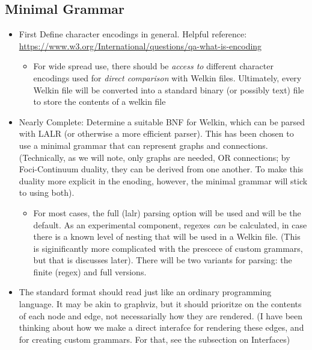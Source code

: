 \subsection{Minimal Grammar}
\begin{itemize}
	\item First Define character encodings in general. Helpful reference: \url{https://www.w3.org/International/questions/qa-what-is-encoding}
	      \begin{itemize}
		      \item For wide spread use, there should be \textit{access to} different character encodings used for \textit{direct comparison} with Welkin files. Ultimately, every Welkin file will be converted into a standard binary (or possibly text) file to store the contents of a welkin file
	      \end{itemize}
	\item Nearly Complete: Determine a suitable BNF for Welkin, which can be parsed with LALR (or otherwise a more efficient parser). This has been chosen to use a minimal grammar that can represent graphs and connections. (Technically, as we will note, only graphs are needed, OR connections; by Foci-Continuum duality, they can be derived from one another. To make this duality more explicit in the enoding, however, the minimal grammar will stick to using both).
	      \begin{itemize}
		      \item For most cases, the full (lalr) parsing option will be used and will be the default. As an experimental component, regexes \textit{can} be calculated, in case there is a known level of nesting that will be used in a Welkin file. (This is siginificantly more complicated with the prescece of custom grammars, but that is discusses later). There will be two variants for parsing: the finite (regex) and full versions.
		            \end{itemize}
		      \item The standard format should read just like an ordinary programming language. It may be akin to graphviz, but it should prioritze on the contents of each node and edge, not necessarially how they are rendered. (I have been thinking about how we make a direct interafce for rendering these edges, and for creating custom grammars. For that, see the subsection on Interfaces)
		            \begin{itemize}


\end{itemize}
\end{itemize}
